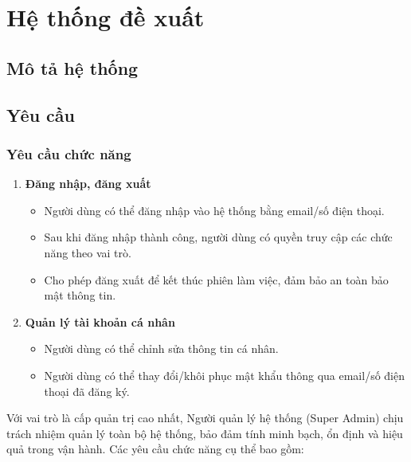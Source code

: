 \section{Hệ thống đề xuất}
\subsection{Mô tả hệ thống}

\subsection{Yêu cầu}
\subsubsection{Yêu cầu chức năng}
\begin{enumerate}[label=\textbf{\alph*)}]
 \item \textbf{Đăng nhập, đăng xuất}
 \begin{itemize}
    \item Người dùng có thể đăng nhập vào hệ thống bằng email/số điện thoại.
    \item Sau khi đăng nhập thành công, người dùng có quyền truy cập các chức năng theo vai trò.
    \item Cho phép đăng xuất để kết thúc phiên làm việc, đảm bảo an toàn bảo mật thông tin.
 \end{itemize}
 \item \textbf{Quản lý tài khoản cá nhân}
 \begin{itemize}
    \item Người dùng có thể chỉnh sửa thông tin cá nhân.
    \item Người dùng có thể thay đổi/khôi phục mật khẩu thông qua email/số điện thoại đã đăng ký.
 \end{itemize}
\end{enumerate}
Với vai trò là cấp quản trị cao nhất, Người quản lý hệ thống (Super Admin) chịu trách nhiệm quản lý toàn bộ hệ thống, bảo đảm tính minh bạch, ổn định và hiệu quả trong vận hành. Các yêu cầu chức năng cụ thể bao gồm:
